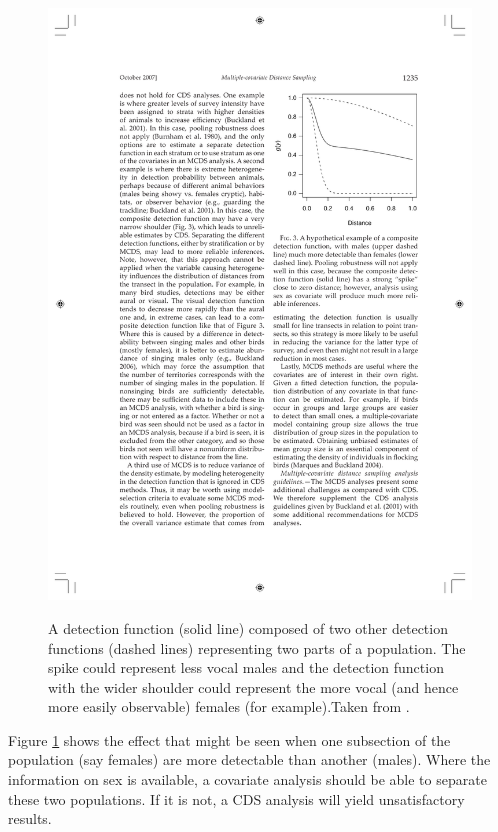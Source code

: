 \begin{figure}
\centering
\includegraphics{intro/figs/malefemale-detfct.pdf}\\
\caption{A detection function (solid line) composed of two other detection functions (dashed lines) representing two parts of a population. The spike could represent less vocal males and the detection function with the wider shoulder could represent the more vocal (and hence more easily observable) females (for example).Taken from .}
\label{ds-malefemale-detfct}
\end{figure}

Figure \ref{ds-malefemale-detfct} shows the effect that might be seen when one subsection of the population (say females) are more detectable than another (males). Where the information on sex is available, a covariate analysis should be able to separate these two populations. If it is not, a CDS analysis will yield unsatisfactory results.

